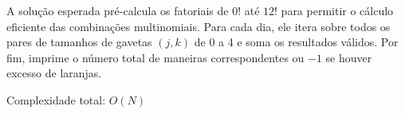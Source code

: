 A solução esperada pré-calcula os fatoriais de \(0!\) até \(12!\) para permitir o cálculo eficiente das combinações multinomiais. Para cada dia, ele itera sobre todos os pares de tamanhos de gavetas \((j, k)\) de 0 a 4 e soma os resultados válidos. Por fim, imprime o número total de maneiras correspondentes ou \(-1\) se houver excesso de laranjas.

Complexidade total: $O(N)$

